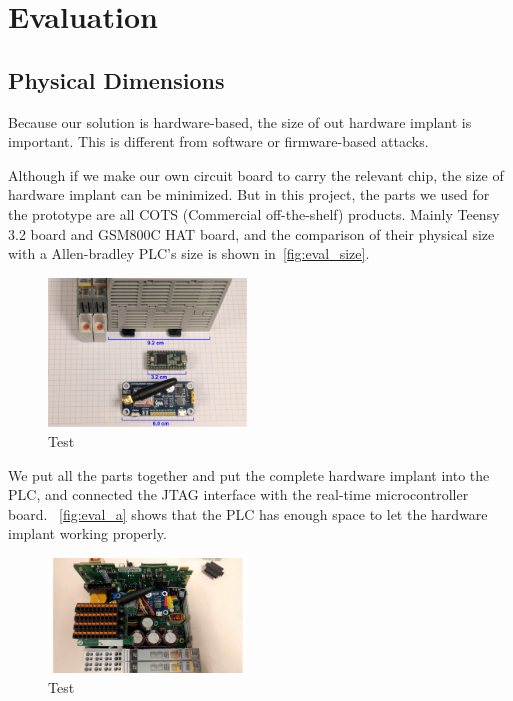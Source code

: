 \section{Evaluation}
\label{sec:implant-evaluation}

\subsection{Physical Dimensions}
Because our solution is hardware-based, the size of out hardware implant is important. This is different from software or firmware-based attacks.

Although if we make our own circuit board to carry the relevant chip, the size of hardware implant can be minimized. But in this project, the parts we used for the prototype are all COTS (Commercial off-the-shelf) products. Mainly Teensy 3.2 board and GSM800C HAT board, and the comparison of their physical size with a Allen-bradley PLC's size is shown in~\autoref{fig:eval_size}.

\begin{figure}[th]
	\includegraphics[width=0.47\textwidth]{figures/eval_size}
	\centering
	\caption{Test}
	\label{fig:eval_size}
\end{figure}

We put all the parts together and put the complete hardware implant into the PLC, and connected the JTAG interface with the real-time microcontroller board. ~\autoref{fig:eval_a} shows that the PLC has enough space to let the hardware implant working properly. 

\begin{figure}[th]
	\includegraphics[width=0.47\textwidth]{figures/eval_a}
	\centering
	\caption{Test}
	\label{fig:eval_a}
\end{figure}

